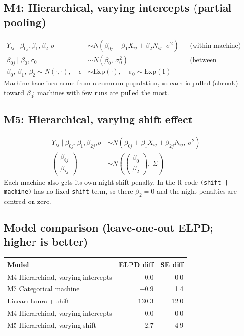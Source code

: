 \documentclass{article}
\begin{document}
\subsection*{M4: Hierarchical, varying intercepts (partial pooling)}
\begin{align*}
Y_{ij} \mid \beta_{0j},\beta_1,\beta_2,\sigma &\sim
  N(\beta_{0j} + \beta_1 X_{ij} + \beta_2 N_{ij},\ \sigma^2)
  && \text{(within machine)}\\
\beta_{0j} \mid \beta_0,\sigma_0 &\sim N(\beta_0,\ \sigma_0^2)
  && \text{(between machines)}\\
\beta_0,\ \beta_1,\ \beta_2 \sim N(\cdot,\cdot), \quad \sigma &\sim \text{Exp}(\cdot), \quad
\sigma_0 \sim \text{Exp}(1)
\end{align*}
Machine baselines come from a common population, so each is pulled
(shrunk) toward $\beta_0$; machines with few runs are pulled the most.

\subsection*{M5: Hierarchical, varying shift effect}
\begin{align*}
Y_{ij} \mid \beta_{0j},\beta_1,\beta_{2j},\sigma &\sim
  N(\beta_{0j} + \beta_1 X_{ij} + \beta_{2j} N_{ij},\ \sigma^2)\\
\begin{pmatrix}\beta_{0j}\\ \beta_{2j}\end{pmatrix} &\sim
  N\!\left(\begin{pmatrix}\beta_0\\ \beta_2\end{pmatrix},\ \Sigma\right)
\end{align*}
Each machine also gets its own night-shift penalty. In the R code
\texttt{(shift | machine)} has no fixed \texttt{shift} term, so there
$\beta_2 = 0$ and the night penalties are centred on zero.

\subsection*{Model comparison (leave-one-out ELPD; higher is better)}
\begin{tabular}{lrr}
\hline
Model & ELPD diff & SE diff \\
\hline
M4 Hierarchical, varying intercepts & 0.0 & 0.0 \\
M3 Categorical machine & $-0.9$ & 1.4 \\
Linear: hours + shift & $-130.3$ & 12.0 \\
\hline
M4 Hierarchical, varying intercepts & 0.0 & 0.0 \\
M5 Hierarchical, varying shift & $-2.7$ & 4.9 \\
\hline
\end{tabular}
\end{document}
